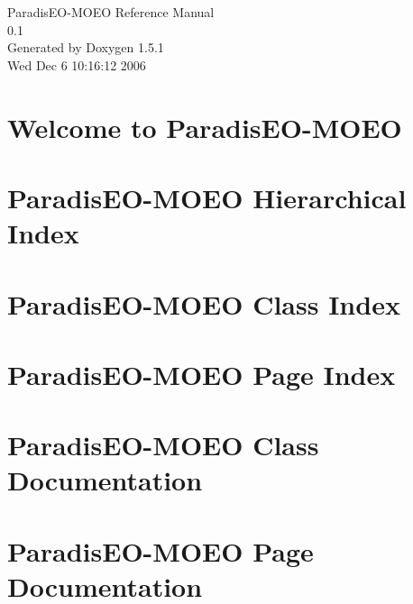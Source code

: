 \documentclass[a4paper]{book}
\begin{document}
\begin{titlepage}
\vspace*{7cm}
\begin{center}
{\Large Paradis\-EO-MOEO Reference Manual\\[1ex]\large 0.1 }\\
\vspace*{1cm}
{\large Generated by Doxygen 1.5.1}\\
\vspace*{0.5cm}
{\small Wed Dec 6 10:16:12 2006}\\
\end{center}
\end{titlepage}
\clearemptydoublepage
{}
\tableofcontents
\clearemptydoublepage
{}
\chapter{Welcome to Paradis\-EO-MOEO }
\label{index}
\chapter{Paradis\-EO-MOEO Hierarchical Index}

\chapter{Paradis\-EO-MOEO Class Index}

\chapter{Paradis\-EO-MOEO Page Index}

\chapter{Paradis\-EO-MOEO Class Documentation}





















\chapter{Paradis\-EO-MOEO Page Documentation}

\printindex
\end{document}
